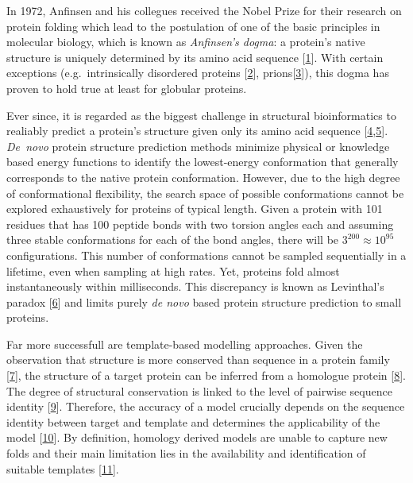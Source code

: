 \documentclass[11pt,a4paper,twoside]{book}
\theoremstyle{definition}
\theoremstyle{definition}
\theoremstyle{remark}
\begin{document}
In 1972, Anfinsen and his collegues received the Nobel Prize for their
research on protein folding which lead to the postulation of one of the
basic principles in molecular biology, which is known as
\emph{Anfinsen's dogma}: a protein's native structure is uniquely
determined by its amino acid sequence
{[}\protect\hyperlink{ref-Anfinsen1973}{1}{]}. With certain exceptions
(e.g.~intrinsically disordered proteins
{[}\protect\hyperlink{ref-Wright1999}{2}{]},
prions{[}\protect\hyperlink{ref-Fraser2014}{3}{]}), this dogma has
proven to hold true at least for globular proteins.

Ever since, it is regarded as the biggest challenge in structural
bioinformatics to realiably predict a protein's structure given only its
amino acid sequence
{[}\protect\hyperlink{ref-Samish2015}{4},\protect\hyperlink{ref-Schwede2013}{5}{]}.
\emph{De~novo} protein structure prediction methods minimize physical or
knowledge based energy functions to identify the lowest-energy
conformation that generally corresponds to the native protein
conformation. However, due to the high degree of conformational
flexibility, the search space of possible conformations cannot be
explored exhaustively for proteins of typical length. Given a protein
with 101 residues that has 100 peptide bonds with two torsion angles
each and assuming three stable conformations for each of the bond
angles, there will be \(3^200 \approx 10^{95}\) configurations. This
number of conformations cannot be sampled sequentially in a lifetime,
even when sampling at high rates. Yet, proteins fold almost
instantaneously within milliseconds. This discrepancy is known as
Levinthal's paradox {[}\protect\hyperlink{ref-Levinthal1969}{6}{]} and
limits purely \emph{de novo} based protein structure prediction to small
proteins.

Far more successfull are template-based modelling approaches. Given the
observation that structure is more conserved than sequence in a protein
family {[}\protect\hyperlink{ref-Lesk1980}{7}{]}, the structure of a
target protein can be inferred from a homologue protein
{[}\protect\hyperlink{ref-Sander1991}{8}{]}. The degree of structural
conservation is linked to the level of pairwise sequence identity
{[}\protect\hyperlink{ref-Chothia1986}{9}{]}. Therefore, the accuracy of
a model crucially depends on the sequence identity between target and
template and determines the applicability of the model
{[}\protect\hyperlink{ref-Marti-Renom2000}{10}{]}. By definition,
homology derived models are unable to capture new folds and their main
limitation lies in the availability and identification of suitable
templates {[}\protect\hyperlink{ref-Dorn2014}{11}{]}.
\end{document}
